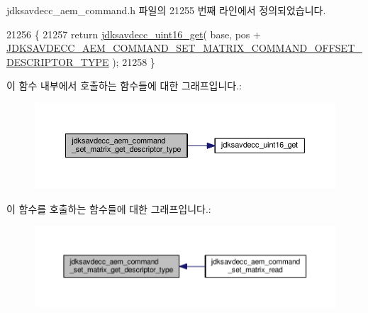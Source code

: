 jdksavdecc\+\_\+aem\+\_\+command.\+h 파일의 21255 번째 라인에서 정의되었습니다.


\begin{DoxyCode}
21256 \{
21257     \textcolor{keywordflow}{return} \hyperlink{group__endian_ga3fbbbc20be954aa61e039872965b0dc9}{jdksavdecc\_uint16\_get}( base, pos + 
      \hyperlink{group__command__set__matrix_gad2f7cf583a047cf627bb5878eb55fad4}{JDKSAVDECC\_AEM\_COMMAND\_SET\_MATRIX\_COMMAND\_OFFSET\_DESCRIPTOR\_TYPE}
       );
21258 \}
\end{DoxyCode}


이 함수 내부에서 호출하는 함수들에 대한 그래프입니다.\+:
\nopagebreak
\begin{figure}[H]
\begin{center}
\leavevmode
\includegraphics[width=350pt]{group__command__set__matrix_ga7d17c2e51205c6a76b6a32c4720b82e8_cgraph}
\end{center}
\end{figure}




이 함수를 호출하는 함수들에 대한 그래프입니다.\+:
\nopagebreak
\begin{figure}[H]
\begin{center}
\leavevmode
\includegraphics[width=350pt]{group__command__set__matrix_ga7d17c2e51205c6a76b6a32c4720b82e8_icgraph}
\end{center}
\end{figure}


